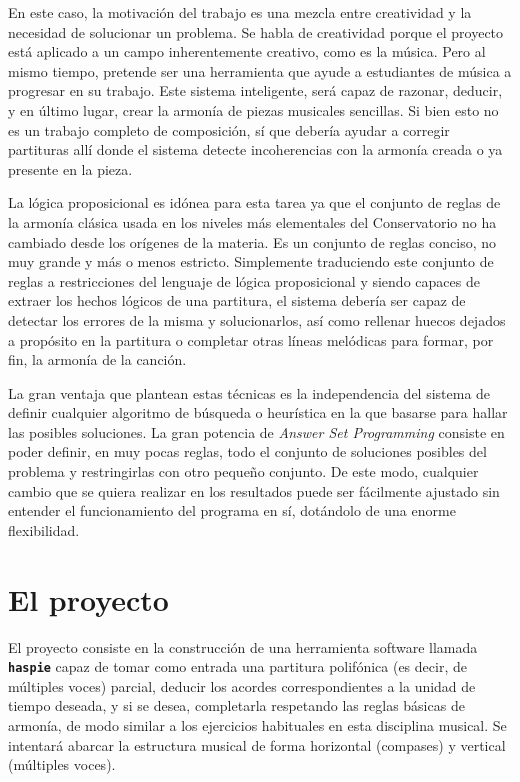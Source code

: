  En este caso, la motivación del trabajo es una mezcla entre creatividad y la necesidad de solucionar un problema. Se habla de creatividad porque el proyecto está aplicado a un campo inherentemente creativo, como es la música. Pero al mismo tiempo, pretende ser una herramienta que ayude a estudiantes de música a progresar en su trabajo. Este sistema inteligente, será capaz de razonar, deducir, y en último lugar, crear la armonía de piezas musicales sencillas. Si bien esto no es un trabajo completo de composición, sí que debería ayudar a corregir partituras allí donde el sistema detecte incoherencias con la armonía creada o ya presente en la pieza. 
 
La lógica proposicional es idónea para esta tarea ya que el conjunto de reglas de la armonía clásica usada en los niveles más elementales del Conservatorio no ha cambiado desde los orígenes de la materia. Es un conjunto de reglas conciso, no muy grande y más o menos estricto. Simplemente traduciendo este conjunto de reglas a restricciones del lenguaje de lógica proposicional y siendo capaces de extraer los hechos lógicos de una partitura, el sistema debería ser capaz de detectar los errores de la misma y solucionarlos, así como rellenar huecos dejados a propósito en la partitura o completar otras líneas melódicas para formar, por fin, la armonía de la canción.

La gran ventaja que plantean estas técnicas es la independencia del sistema de definir cualquier algoritmo de búsqueda o heurística en la que basarse para hallar las posibles soluciones. La gran potencia de \textit{Answer Set Programming} consiste en poder definir, en muy pocas reglas, todo el conjunto de soluciones posibles del problema y restringirlas con otro pequeño conjunto. De este modo, cualquier cambio que se quiera realizar en los resultados puede ser fácilmente ajustado sin entender el funcionamiento del programa en sí, dotándolo de una enorme flexibilidad.

 
 \section{El proyecto}
  \label{sec:the_project}
 El proyecto consiste en la construcción de una herramienta software llamada \textbf{\texttt{haspie}} capaz de tomar como entrada una partitura polifónica (es decir, de múltiples voces) parcial, deducir los acordes correspondientes a la unidad de tiempo deseada, y si se desea, completarla respetando las reglas básicas de armonía, de modo similar a los ejercicios habituales en esta disciplina musical. Se intentará abarcar la estructura musical de forma horizontal (compases) y vertical (múltiples voces). 
 
